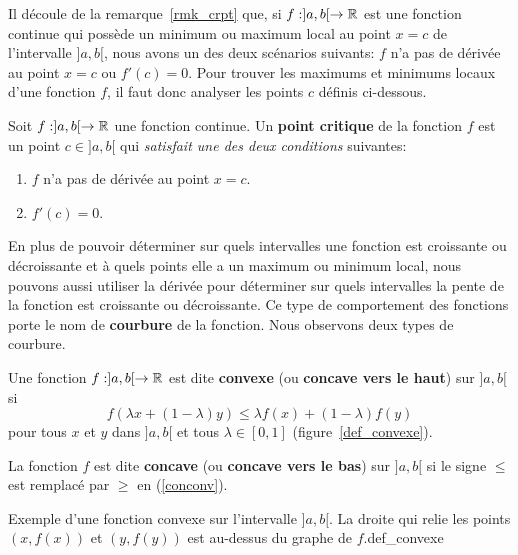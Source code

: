{Il découle de la remarque~\ref{rmk_crpt} que, si $f:]a,b[\to \mathbb{R}$ est
une fonction continue qui possède un minimum ou maximum local au point
$x=c$ de l'intervalle $]a,b[$, nous avons un des deux scénarios suivants:
$f$ n'a pas de dérivée au point $x=c$ ou $f'(c) = 0$.  Pour trouver
les maximums et minimums locaux d'une fonction $f$, il faut donc
analyser les points $c$ définis ci-dessous.

\begin{focus}{\dfn} 
Soit $f:]a,b[ \to \mathbb{R}$ une fonction continue.
Un {\bfseries point critique} de la fonction $f$ est un point
$c \in ]a,b[$ qui {\em satisfait une des deux conditions} suivantes:
\begin{enumerate}
\item $f$ n'a pas de dérivée au point $x=c$.
\item $f'(c) = 0$.
\end{enumerate}
\end{focus}

En plus de pouvoir déterminer sur quels intervalles une fonction est
croissante ou décrois\-sante et à quels points elle a un maximum ou
minimum local, nous pouvons aussi utiliser la dérivée pour déterminer sur
quels intervalles la pente de la fonction est croissante ou
décroissante.  Ce type de comportement des fonctions porte le nom de
{\bfseries courbure} de la fonction.  Nous observons deux
types de courbure.

\begin{focus}{\dfn}
Une fonction $f:]a,b[\to \mathbb{R}$ est dite {\bfseries convexe} (ou
{\bfseries concave vers le haut}) sur $]a,b[$ si
\begin{equation} \label{conconv}
f(\lambda x + (1-\lambda)y) \leq \lambda f(x) + (1-\lambda)f(y)
\end{equation}
pour tous $x$ et $y$ dans $]a,b[$ et tous $\lambda \in [0,1]$
(figure~\ref{def_convexe}).
 

La fonction $f$ est dite {\bfseries concave} (ou
{\bfseries concave vers le bas}) sur $]a,b[$
si le signe $\leq$ est remplacé par $\geq$ en (\ref{conconv}).
 
\end{focus}

{Exemple d'une fonction convexe sur l'intervalle $]a,b[$.  La droite
qui relie les points $(x,f(x))$ et $(y,f(y))$ est au-dessus du
graphe de $f$.}{def_convexe}

}
